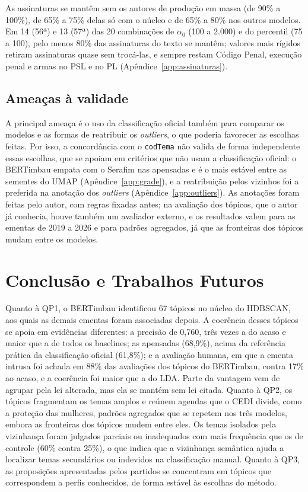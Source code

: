 \documentclass[12pt]{article}
\begin{document}
As assinaturas se mantêm sem os autores de produção em massa (de 90\% a 100\%), de 65\% a 75\% delas só com o núcleo e de 65\% a 80\% nos outros modelos. Em 14 (56ª) e 13 (57ª) das 20 combinações de $\alpha_0$ (100 a 2.000) e do percentil (75 a 100), pelo menos 80\% das assinaturas do texto se mantêm; valores mais rígidos retiram assinaturas quase sem trocá-las, e sempre restam Código Penal, execução penal e armas no PSL e no PL (Apêndice~\ref{app:assinaturas}).

\subsection{Ameaças à validade}
\label{subsec:ameacas}

A principal ameaça é o uso da classificação oficial também para comparar os modelos e as formas de reatribuir os \textit{outliers}, o que poderia favorecer as escolhas feitas. Por isso, a concordância com o \texttt{codTema} não valida de forma independente essas escolhas, que se apoiam em critérios que não usam a classificação oficial: o BERTimbau empata com o Serafim nas apensadas e é o mais estável entre as sementes do UMAP (Apêndice~\ref{app:grade}), e a reatribuição pelos vizinhos foi a preferida na anotação dos \textit{outliers} (Apêndice~\ref{app:outliers}). As anotações foram feitas pelo autor, com regras fixadas antes; na avaliação dos tópicos, que o autor já conhecia, houve também um avaliador externo, e os resultados valem para as ementas de 2019 a 2026 e para padrões agregados, já que as fronteiras dos tópicos mudam entre os modelos.

\section{Conclusão e Trabalhos Futuros}
\label{sec:conclusao}

Quanto à QP1, o BERTimbau identificou 67 tópicos no núcleo do HDBSCAN, aos quais as demais ementas foram associadas depois. A coerência desses tópicos se apoia em evidências diferentes: a precisão de 0,760, três vezes a do acaso e maior que a de todos os baselines; as apensadas (68,9\%), acima da referência prática da classificação oficial (61,8\%); e a avaliação humana, em que a ementa intrusa foi achada em 88\% das avaliações dos tópicos do BERTimbau, contra 17\% ao acaso, e a coerência foi maior que a do LDA. Parte da vantagem vem de agrupar pela lei alterada, mas ela se mantém sem lei citada. Quanto à QP2, os tópicos fragmentam os temas amplos e reúnem agendas que o CEDI divide, como a proteção das mulheres, padrões agregados que se repetem nos três modelos, embora as fronteiras dos tópicos mudem entre eles. Os temas isolados pela vizinhança foram julgados parciais ou inadequados com mais frequência que os de controle (60\% contra 25\%), o que indica que a vizinhança semântica ajuda a localizar temas secundários ou indevidos na classificação manual. Quanto à QP3, as proposições apresentadas pelos partidos se concentram em tópicos que correspondem a perfis conhecidos, de forma estável às escolhas do método.
\end{document}
